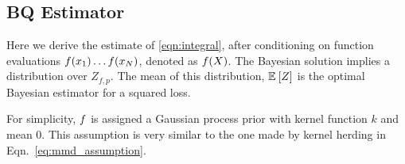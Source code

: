 \documentclass[]{article}
\begin{document}


\subsection{ BQ Estimator}

Here we derive the \bq{} estimate of \eqref{eqn:integral}, after conditioning on function evaluations ${f}({x}_1) \dots {f}({x}_N)$, denoted as $f({X})$.  The Bayesian solution implies a distribution over $Z_{f,p}$.  The mean of this distribution, $\mathbb{E}_{} \left[ {Z} \right]$ is the optimal Bayesian estimator for a squared loss.

For simplicity, ${f}$ is assigned a Gaussian process prior with kernel function $k$ and mean $0$.  This assumption is very similar to the one made by kernel herding in Eqn.\ \eqref{eq:mmd_assumption}.
\end{document}
